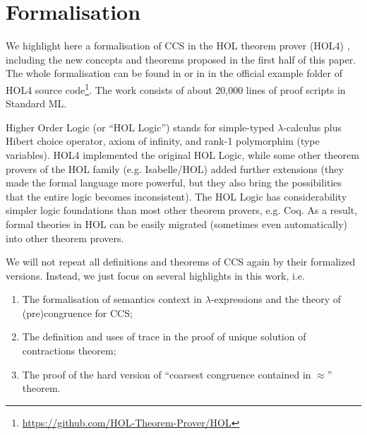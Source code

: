 \section{Formalisation}

We highlight here a formalisation of CCS
in the HOL theorem
prover (HOL4) \cite{slind2008brief},
including the new concepts and theorems proposed in the first half of
this paper.
The whole formalisation can be found 
in \cite{Tian:2017wrba}  or in 
 in the official example folder of HOL4 source
code\footnote{\url{https://github.com/HOL-Theorem-Prover/HOL}}. The
work consists of about 20,000 lines of proof scripts in Standard ML.

Higher Order Logic (or ``HOL Logic'') \cite{hollogic} stands for simple-typed $\lambda$-calculus plus Hibert
choice operator, axiom of infinity, and rank-1 polymorphim (type
variables). HOL4 implemented the original HOL Logic, while
some other theorem provers of the HOL family (e.g. Isabelle/HOL) added
further extensions (they made the formal language more powerful,
but they also bring the possibilities that the entire logic becomes inconsistent).
The HOL Logic has considerability simpler logic
foundations than most other theorem provers, e.g. Coq. As a result,
formal theories in HOL can be easily migrated (sometimes even
automatically) into other theorem provers.

We will not repeat all definitions and theorems of CCS again by their
formalized versions. Instead, we just focus on several highlights in
this work, i.e.
\begin{enumerate}
\item The formalisation of semantics context in $\lambda$-expressions and the theory of
  (pre)congruence for CCS;
\item The definition and uses of trace in the proof of unique solution of
  contractions theorem;
\item The proof of the hard version of ``coarsest congruence
  contained in $\approx$'' theorem.
\end{enumerate}


